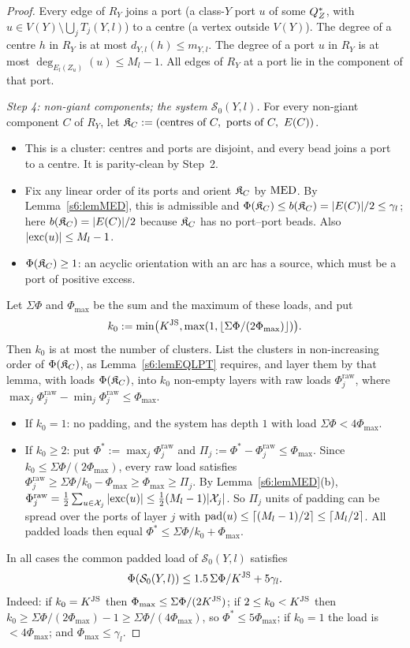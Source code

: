\begin{proof}
Every edge of $R_Y$ joins a port (a class-$Y$ port $u$ of some $Q^{*}_Z$, with $u\in V(Y)\setminus\bigcup_jT_j(Y,l)$) to a centre (a vertex outside $V(Y)$). The degree of a centre $h$ in $R_Y$ is at most $d_{Y,l}(h)\le m_{Y,l}$. The degree of a port $u$ in $R_Y$ is at most $\deg_{E_l(Z_u)}(u)\le M_l-1$. All edges of $R_Y$ at a port lie in the component of that port.

\emph{Step 4: non-giant components; the system $\mathcal S_0(Y,l)$.} For every non-giant component $C$ of $R_Y$, let $\clu_C:=(\text{centres of }C,\ \text{ports of }C,\ E(C))$.
\begin{itemize}
\item This is a cluster: centres and ports are disjoint, and every bead joins a port to a centre. It is parity-clean by Step~2.
\item Fix any linear order of its ports and orient $\mathfrak{K}_C$ by $\mathrm{MED}$. By Lemma~\ref{s6:lemMED}, this is admissible and $\Phi(\mathfrak{K}_C)\le b(\mathfrak{K}_C)=|E(C)|/2\le\gamma_l$; here $b(\mathfrak{K}_C)=|E(C)|/2$ because $\mathfrak{K}_C$ has no port--port beads. Also $|\mathrm{exc}(u)|\le M_l-1$.
\item $\Phi(\mathfrak{K}_C)\ge1$: an acyclic orientation with an arc has a source, which must be a port of positive excess.
\end{itemize}
Let $\Sigma\Phi$ and $\Phi_{\max}$ be the sum and the maximum of these loads, and put
\[
k_0:=\min\bigl(K^{\mathrm{JS}},\max(1,\lfloor\Sigma\Phi/(2\Phi_{\max})\rfloor)\bigr).
\]
Then $k_0$ is at most the number of clusters. List the clusters in non-increasing order of $\Phi(\mathfrak{K}_C)$, as Lemma~\ref{s6:lemEQLPT} requires, and layer them by that lemma, with loads $\Phi(\mathfrak{K}_C)$, into $k_0$ non-empty layers with raw loads $\Phi^{\mathrm{raw}}_j$, where $\max_j\Phi^{\mathrm{raw}}_j-\min_j\Phi^{\mathrm{raw}}_j\le\Phi_{\max}$.
\begin{itemize}
\item If $k_0=1$: no padding, and the system has depth $1$ with load $\Sigma\Phi<4\Phi_{\max}$.
\item If $k_0\ge2$: put $\Phi^*:=\max_j\Phi^{\mathrm{raw}}_j$ and $\Pi_j:=\Phi^*-\Phi^{\mathrm{raw}}_j\le\Phi_{\max}$. Since $k_0\le\Sigma\Phi/(2\Phi_{\max})$, every raw load satisfies $\Phi^{\mathrm{raw}}_j\ge\Sigma\Phi/k_0-\Phi_{\max}\ge\Phi_{\max}\ge\Pi_j$. By Lemma~\ref{s6:lemMED}(b), $\Phi^{\mathrm{raw}}_j=\frac12\sum_{u\in\mathcal{X}_j}|\mathrm{exc}(u)|\le\frac12(M_l-1)|\mathcal{X}_j|$. So $\Pi_j$ units of padding can be spread over the ports of layer $j$ with $\mathrm{pad}(u)\le\lceil(M_l-1)/2\rceil\le\lceil M_l/2\rceil$. All padded loads then equal $\Phi^*\le\Sigma\Phi/k_0+\Phi_{\max}$.
\end{itemize}
In all cases the common padded load of $\mathcal S_0(Y,l)$ satisfies
\begin{equation}\label{s6:eqSzeroCost}
\Phi(\mathcal S_0(Y,l))\le1.5\,\Sigma\Phi/K^{\mathrm{JS}}+5\gamma_l.
\end{equation}
Indeed: if $k_0=K^{\mathrm{JS}}$ then $\Phi_{\max}\le\Sigma\Phi/(2K^{\mathrm{JS}})$; if $2\le k_0<K^{\mathrm{JS}}$ then $k_0\ge\Sigma\Phi/(2\Phi_{\max})-1\ge\Sigma\Phi/(4\Phi_{\max})$, so $\Phi^*\le5\Phi_{\max}$; if $k_0=1$ the load is $<4\Phi_{\max}$; and $\Phi_{\max}\le\gamma_l$.


\end{proof}
